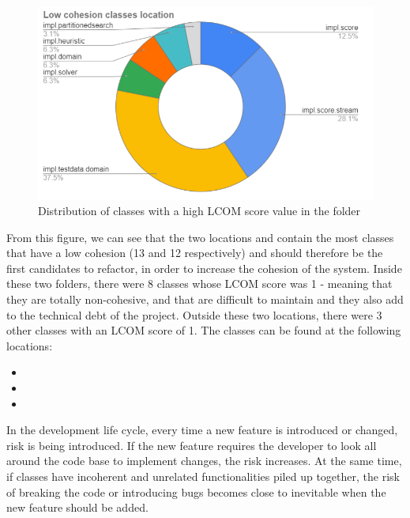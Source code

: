             \begin{figure}[H]
                \centering
                \includegraphics[scale=.7]{figures/step4/lowcohesion.PNG}
                \caption{Distribution of classes with a high LCOM score value in the  folder}
                \label{fig:lowcohesion}
            \end{figure}
            From this figure, we can see that the two locations  and  contain the most classes that have a low cohesion (13 and 12 respectively) and should therefore be the first candidates to refactor, in order to increase the cohesion of the system. Inside these two folders, there were 8 classes whose LCOM score was 1 - meaning that they are totally non-cohesive, and that are difficult to maintain and they also add to the technical debt of the project. Outside these two locations, there were 3 other classes with an LCOM score of 1. The classes can be found at the following locations:                    
            \begin{itemize}
                \item {}
                \item {}
                \item {}
            \end{itemize}
            In the development life cycle, every time a new feature is introduced or changed, risk is being introduced. If the new feature requires the developer to look all around the code base to implement changes, the risk increases. At the same time, if classes have incoherent and unrelated functionalities piled up together, the risk of breaking the code or introducing bugs becomes close to inevitable when the new feature should be added.\\
